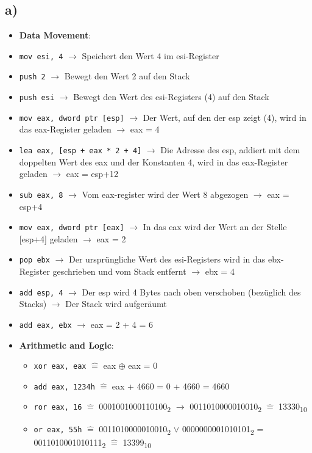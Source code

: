 \documentclass[]{scrreprt}
\begin{document}
	\subsection*{a)}
	\begin{itemize}
		\item \textbf{Data Movement}:
		\item \texttt{mov esi, 4} $\rightarrow$ Speichert den Wert 4 im esi-Register
		\item \texttt{push 2} $\rightarrow$ Bewegt den Wert 2 auf den Stack
		\item \texttt{push esi} $\rightarrow$ Bewegt den Wert des esi-Registers (4) auf den Stack
		\item \texttt{mov eax, dword ptr [esp]} $\rightarrow$ Der Wert, auf den der esp zeigt (4), wird in das eax-Register geladen $\rightarrow$ eax = 4
		\item \texttt{lea eax, [esp + eax * 2 + 4]} $\rightarrow$ Die Adresse des esp, addiert mit dem doppelten Wert des eax und der Konstanten 4, wird in das eax-Register geladen $\rightarrow$ eax = esp+12
		\item \texttt{sub eax, 8} $\rightarrow$ Vom eax-register wird der Wert 8 abgezogen $\rightarrow$ eax = esp+4
		\item \texttt{mov eax, dword ptr [eax]} $\rightarrow$ In das eax wird der Wert an der Stelle [esp+4] geladen $\rightarrow$ eax = 2
		\item \texttt{pop ebx} $\rightarrow$ Der ursprüngliche Wert des esi-Registers wird in das ebx-Register geschrieben und vom Stack entfernt $\rightarrow$ ebx = 4
		\item \texttt{add esp, 4} $\rightarrow$ Der esp wird 4 Bytes nach oben verschoben (bezüglich des Stacks) $\rightarrow$ Der Stack wird aufgeräumt
		\item \texttt{add eax, ebx} $\rightarrow$ eax = 2 + 4 = 6
		\item  \textbf{Arithmetic and Logic}:
		\begin{itemize}
			\item \texttt{xor eax, eax} $\hat{=}$ eax $\oplus$ eax = 0
			\item \texttt{add eax, 1234h} $\hat{=}$ eax + 4660 = 0 + 4660 = 4660
			\item \texttt{ror eax, 16} $\hat{=}$ {0001001000110100}\textsubscript{2} $\rightarrow$ {0011010000010010}\textsubscript{2} $\hat{=}$  {13330}\textsubscript{10}
			\item \texttt{or eax, 55h} $\hat{=}$ {0011010000010010}\textsubscript{2} $\vee$ {0000000001010101}\textsubscript{2} = {0011010001010111}\textsubscript{2} $\hat{=}$ {13399}\textsubscript{10}

\end{itemize}
\end{itemize}
\end{document}
